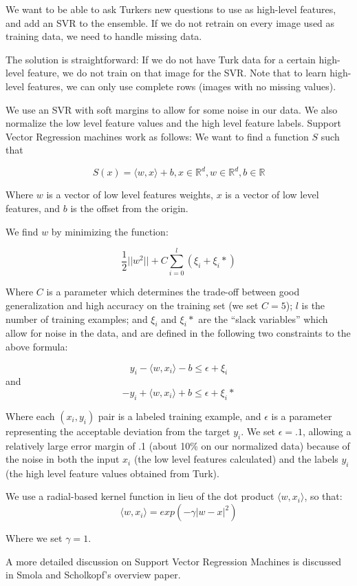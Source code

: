 \documentclass[11pt,letter]{article}
\begin{document}
We want to be able to ask Turkers new questions to use as high-level features, and add an SVR to the ensemble. If we do not retrain on every image used as training data, we need to handle missing data.

The solution is straightforward: If we do not have Turk data for a certain high-level feature, we do not train on that image for the SVR. Note that to learn high-level features, we can only use complete rows (images with no missing values).

We use an SVR with soft margins to allow for some noise in our data. We also normalize the low level feature values and the high level feature labels. Support Vector Regression machines work as follows: We want to find a function $S$ such that

\[
S(x)=\langle w, x\rangle + b, x\in \mathbb{R}^d, w\in \mathbb{R}^d, b\in \mathbb{R}
\]

Where $w$ is a vector of low level features weights, $x$ is a vector of low level features, and $b$ is the offset from the origin.

We find $w$ by minimizing the function:

\[
\frac{1}{2}||w^2||+C\displaystyle\sum\limits_{i=0}^l(\xi_i+\xi_i*)
\]

Where $C$ is a parameter which determines the trade-off between good generalization and high accuracy on the training set (we set $C=5$); $l$ is the number of training examples; and $\xi_i$ and $\xi_i*$ are the ``slack variables'' which allow for noise in the data, and are defined in the following two constraints to the above formula:

\[
y_i-\langle w,x_i\rangle-b\leq \epsilon + \xi_i
\]
and
\[
-y_i+\langle w,x_i\rangle+b\leq \epsilon + \xi_i*
\]

Where each $(x_i, y_i)$ pair is a labeled training example, and $\epsilon$ is a parameter representing the acceptable deviation from the target $y_i$. We set $\epsilon=.1$, allowing a relatively large error margin of .1 (about 10\% on our normalized data) because of the noise in both the input $x_i$ (the low level features calculated) and the labels $y_i$ (the high level feature values obtained from Turk).

We use a radial-based kernel function in lieu of the dot product $\langle w,x_i\rangle$, so that:
\[
\langle w,x_i\rangle = exp(-\gamma |w-x|^2)
\]

Where we set $\gamma=1$.

A more detailed discussion on Support Vector Regression Machines is discussed in Smola and Scholkopf's overview paper\cite{springerlink:10.1023/B:STCO.0000035301.49549.88}.
\end{document}
